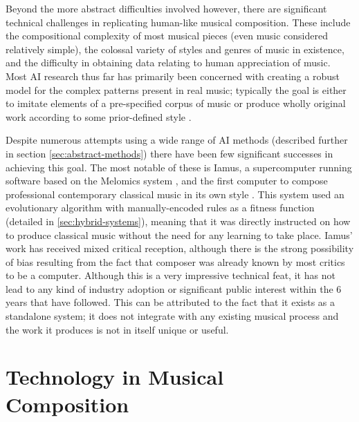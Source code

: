 \documentclass[ author={Stephen Livermore-Tozer},
				supervisor={Dr. Peter Flach},
				degree={MEng},
				title={Algorithmic Co-composition Using Machine Learning},
				subtitle={},
				type={research},
				year={2016} ]{dissertation}
\begin{document}
	Beyond the more abstract difficulties involved however, there are significant technical challenges in replicating human-like musical composition. These include the compositional complexity of most musical pieces (even music considered relatively simple), the colossal variety of styles and genres of music in existence, and the difficulty in obtaining data relating to human appreciation of music. Most AI research thus far has primarily been concerned with creating a robust model for the complex patterns present in real music; typically the goal is either to imitate elements of a pre-specified corpus of music \cite{paiement2007generative,todd1989connectionist} or produce wholly original work according to some prior-defined style \cite{diaz2011composing,burton1998hybrid,horowitz1995representing}. 
	
	Despite numerous attempts using a wide range of AI methods (described further in section \ref{sec:abstract-methods}) there have been few significant successes in achieving this goal. The most notable of these is Iamus, a supercomputer running software based on the Melomics system \cite{diaz2011composing}, and the first computer to compose professional contemporary classical music in its own style \cite{scientist2012computer}. This system used an evolutionary algorithm with manually-encoded rules as a fitness function (detailed in \ref{sec:hybrid-systems}), meaning that it was directly instructed on how to produce classical music without the need for any learning to take place. Iamus' work has received mixed critical reception, although there is the strong possibility of bias resulting from the fact that composer was already known by most critics to be a computer. Although this is a very impressive technical feat, it has not lead to any kind of industry adoption or significant public interest within the 6 years that have followed. This can be attributed to the fact that it exists as a standalone system; it does not integrate with any existing musical process and the work it produces is not in itself unique or useful.
	
	\section{Technology in Musical Composition}
	\label{sec:tech-in-music}
	
\end{document}
